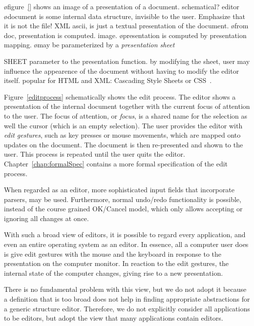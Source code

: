 \bl
\o figure~\ref{} shows an image of a presentation of a document. schematical? editor
\o document is some internal data structure, invisible to the user. Emphasize that it is not the file! XML ascii, is just a textual presentation of the document.
\o from doc, presentation is computed. image.
\o presentation is computed by presentation mapping.
\o may be parameterized by a {\em presentation sheet}
\el

SHEET parameter to the presentation function. by modifying the sheet, user may influence the appearence of the document without having to modify the editor itself. popular for HTML and XML: Cascading Style Sheets or CSS~\cite{css2}.

Figure~\ref{editprocess} schematically shows the edit process. The editor shows a presentation of the internal document together with the current focus of attention to the user. The focus of attention, or {\em focus}, is a shared name for the selection as well the cursor (which is an empty selection). The user provides the editor with {\em edit gestures}, such as key presses or mouse movements, which are mapped onto updates on the document. The document is then re-presented and shown to the user. This process is repeated until the user quits the editor. Chapter~\ref{chap:formalSpec} contains a more formal specification of the edit process.


\bc
When regarded as an editor, more sophisticated input fields that incorporate parsers, may be used. Furthermore, normal undo/redo functionality is possible, instead of the course grained OK/Cancel model, which only allows accepting or ignoring all changes at once.
\ec

\bc
With such a broad view of editors, it is possible to regard every application, and even an entire operating system as an editor. In essence, all a computer user does is give edit gestures with the mouse and the keyboard in response to the presentation on the computer monitor. In reaction to the edit gestures, the internal state of the computer changes, giving rise to a new presentation. 

There is no fundamental problem with this view, but we do not adopt it because a definition that is too broad does not help in finding appropriate abstractions for a generic structure editor. Therefore, we do not explicitly consider all applications to be editors, but adopt the view that many applications contain editors.
\ec

